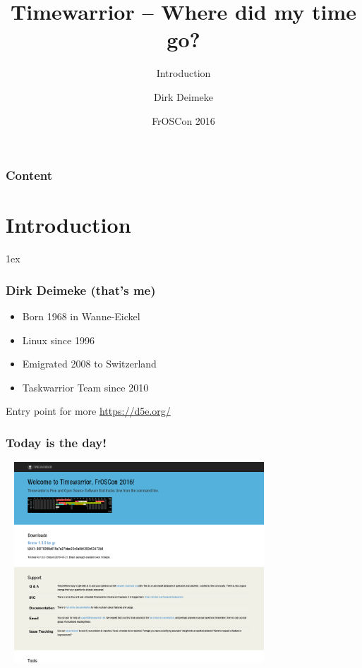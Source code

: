 \documentclass[t,handout]{beamer}
\title{Timewarrior -- Where did my time go?}
\subtitle{Introduction}
\author[Deimeke, Dirk]{Dirk Deimeke}
\institute[Taskwarrior academy]{Taskwarrior academy}
\date{FrOSCon 2016}
\begin{document}
\begin{frame} %
	\titlepage
\end{frame}


\begin{frame}\frametitle{Content}
	\tableofcontents
\end{frame}

\section{Introduction}

\parskip1ex

\begin{frame}[fragile]\frametitle{Dirk Deimeke (that's me)}
    \vfill
    \begin{itemize}
        \item Born 1968 in Wanne-Eickel
        \item Linux since 1996
        \item Emigrated 2008 to Switzerland
        \item Taskwarrior Team since 2010
    \end{itemize}

    Entry point for more \url{https://d5e.org/}
\end{frame}

\begin{frame}[fragile]\frametitle{Today is the day!}
    \begin{center}
        \href{http://timewarrior.net/}{\includegraphics[width=10cm,height=7.5cm]{timewarrior.png}}
    \end{center}
\end{frame}
\end{document}
